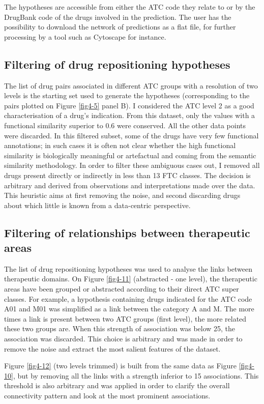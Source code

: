 The hypotheses are accessible from either the ATC code they relate to or by the DrugBank code of the drugs involved in the prediction. The user has the possibility to download the network of predictions as a flat file, for further processing by a tool such as Cytoscape for instance.

\subsection{Filtering of drug repositioning hypotheses}
The list of drug pairs associated in different ATC groups with a resolution of two levels is the starting set used to generate the hypotheses (corresponding to the pairs plotted on Figure \ref{fig4-5} panel B). I considered the ATC level 2 as a good characterisation of a drug's indication. From this dataset, only the values with a functional similarity superior to 0.6 were conserved. All the other data points were discarded. In this filtered subset, some of the drugs have very few functional annotations; in such cases it is often not clear whether the high functional similarity is biologically meaningful or artefactual and coming from the semantic similarity methodology. In order to filter these ambiguous cases out, I removed all drugs present directly or indirectly in less than 13 FTC classes. The decision is arbitrary and derived from observations and interpretations made over the data. This heuristic aims at first removing the noise, and second discarding drugs about which little is known from a data-centric perspective.

\subsection{Filtering of relationships between therapeutic areas}
The list of drug repositioning hypotheses was used to analyse the links between therapeutic domains. On Figure \ref{fig4-11} (abstracted - one level), the therapeutic areas have been grouped or abstracted according to their direct ATC super classes. For example, a hypothesis containing drugs indicated for the ATC code A01 and M01 was simplified as a link between the category A and M. The more times a link is present between two ATC groups (first level), the more related these two groups are. When this strength of association was below 25, the association was discarded. This choice is arbitrary and was made in order to remove the noise and extract the most salient features of the dataset.

Figure \ref{fig4-12} (two levels trimmed) is built from the same data as Figure \ref{fig4-10}, but by removing all the links with a strength inferior to 15 associations. This threshold is also arbitrary and was applied in order to clarify the overall connectivity pattern and look at the most prominent associations.
